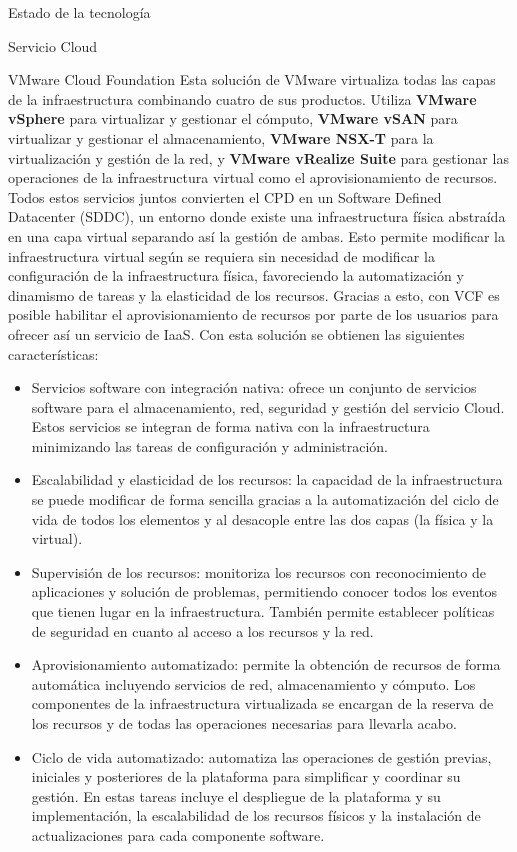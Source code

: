 \begin{chapter}{Estado de la tecnología}
\begin{section}{Servicio Cloud}
\begin{subsection}{VMware Cloud Foundation}
        Esta solución de VMware virtualiza todas las capas de la infraestructura combinando cuatro de sus productos. Utiliza \textbf{VMware vSphere} para virtualizar y gestionar el cómputo, \textbf{VMware vSAN} para virtualizar y gestionar el almacenamiento, \textbf{VMware NSX-T} para la virtualización y gestión de la red, y \textbf{VMware vRealize Suite} para gestionar las operaciones de la infraestructura virtual como el aprovisionamiento de recursos. Todos estos servicios juntos convierten el CPD en un Software Defined Datacenter (SDDC), un entorno donde existe una infraestructura física abstraída en una capa virtual separando así la gestión de ambas. Esto permite modificar la infraestructura virtual según se requiera sin necesidad de modificar la configuración de la infraestructura física, favoreciendo la automatización y dinamismo de tareas y la elasticidad de los recursos. Gracias a esto, con VCF es posible habilitar el aprovisionamiento de recursos por parte de los usuarios para ofrecer así un servicio de IaaS. Con esta solución se obtienen las siguientes características:
        
    \begin{itemize}
        \item Servicios software con integración nativa: ofrece un conjunto de servicios software para el almacenamiento, red, seguridad y gestión del servicio Cloud. Estos servicios se integran de forma nativa con la infraestructura minimizando las tareas de configuración y administración.
        \item Escalabilidad y elasticidad de los recursos: la capacidad de la infraestructura se puede modificar de forma sencilla gracias a la automatización del ciclo de vida de todos los elementos y al desacople entre las dos capas (la física y la virtual).
        \item Supervisión de los recursos: monitoriza los recursos con reconocimiento de aplicaciones y solución de problemas, permitiendo conocer todos los eventos que tienen lugar en la infraestructura. También permite establecer políticas de seguridad en cuanto al acceso a los recursos y la red.
        \item Aprovisionamiento automatizado: permite la obtención de recursos de forma automática incluyendo servicios de red, almacenamiento y cómputo. Los componentes de la infraestructura virtualizada se encargan de la reserva de los recursos y de todas las operaciones necesarias para llevarla acabo.
    
        \item Ciclo de vida automatizado: automatiza las operaciones de gestión previas, iniciales y posteriores de la plataforma para simplificar y coordinar su gestión. En estas tareas incluye el despliegue de la plataforma y su implementación, la escalabilidad de los recursos físicos y la instalación de actualizaciones para cada componente software.
    

\end{itemize}
\end{subsection}
\end{section}
\end{chapter}
